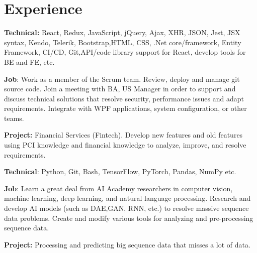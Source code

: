 \documentclass[]{plushcv}
\begin{document}
%
%


%
%

\begin{minipage}[t]{0.70\textwidth} 



\section{Experience}
\vspace{\topsep} %
\begin{tightemize}
\sectionsep
\item \textbf{Technical:} React, Redux, JavaScript, jQuery, Ajax, XHR, JSON, Jest, JSX syntax, Kendo, Telerik, Bootstrap,HTML, CSS, .Net core/framework, Entity Framework, CI/CD, Git,API/code library support for React, develop tools for BE and FE, etc.
\item \textbf{Job}: Work as a member of the Scrum team. Review, deploy and manage git source code. Join a meeting with BA, US Manager in order to support and discuss technical solutions that resolve security, performance issues and adapt requirements. Integrate with WPF applications, system configuration, or other teams.
\item \textbf{Project:} Financial Services (Fintech). Develop new features and old features using PCI knowledge and financial knowledge to analyze, improve, and resolve requirements.
\end{tightemize}
\sectionsep

\begin{tightemize}
\sectionsep
\item \textbf{Technical}: Python, Git, Bash, TensorFlow, PyTorch, Pandas, NumPy etc.
\item \textbf{Job}: Learn a great deal from AI Academy researchers in computer vision, machine learning, deep learning, and natural language processing. Research and develop AI models (such as DAE,GAN, RNN, etc.) to resolve massive sequence data problems. Create and modify various tools for analyzing and pre-processing sequence data.
\item  \textbf{Project:} Processing and predicting big sequence data that misses a lot of data.
\end{tightemize}
\sectionsep


\end{minipage}
\end{document}
